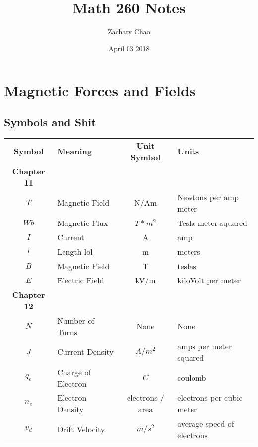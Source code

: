 \documentclass[12pt, letterpaper, twoside]{article}
\title{Math 260 Notes}
\author{Zachary Chao}
\date{April 03 2018}
\begin{document}
\setcounter{section}{10}
\section{Magnetic Forces and Fields}
  \subsection*{Symbols and Shit}
    \begin{tabular}{c l c l}
  	  \textbf{Symbol} & \textbf{Meaning} & \textbf{Unit Symbol} & \textbf{Units}\\
  	  \textbf{Chapter 11} & & &\\
  	  $T$ & Magnetic Field & N/Am & Newtons per amp meter\\
  	  $Wb$ & Magnetic Flux & $T*m^2$ & Tesla meter squared\\
  	  $I$ & Current & A & amp\\
  	  $l$ & Length lol & m & meters\\
  	  $B$ & Magnetic Field & T & teslas\\
  	  $E$ & Electric Field & kV/m & kiloVolt per meter\\
  	  \textbf{Chapter 12} & & &\\
  	  $N$ & Number of Turns & None & None\\
  	  $J$ & Current Density & $A/m^2$ & amps per meter squared\\
      $q_e$ & Charge of Electron & $C$ & coulomb\\
      $n_e$ & Electron Density & electrons / area & electrons per cubic meter\\
      $v_d$ & Drift Velocity & $m/s^2$ & average speed of electrons\\
    \end{tabular}
  
\end{document}
